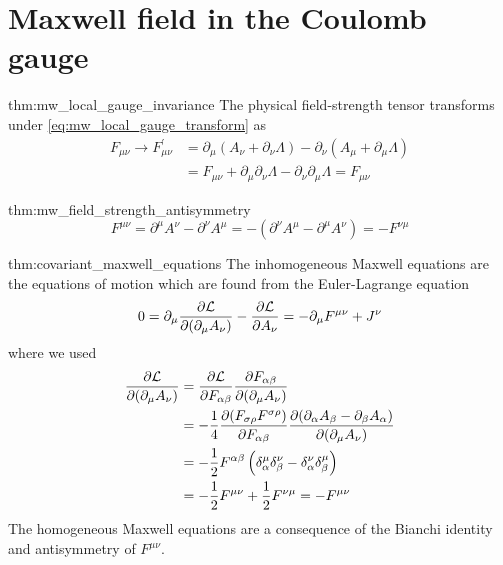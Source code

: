 \section{Maxwell field in the Coulomb gauge}

\begin{delayedproof}{thm:mw_local_gauge_invariance}
	The physical field-strength tensor transforms under \cref{eq:mw_local_gauge_transform} as
	\begin{equation*}
		\begin{split}
			F_{\mu\nu}
			\to
			F_{\mu\nu}^\prime
			&=
			\partial_\mu\left(A_\nu+\partial_\nu\Lambda\right)
			-
			\partial_\nu\left(A_\mu+\partial_\mu\Lambda\right)
			\\
			&=
			F_{\mu\nu}
			+
			\partial_\mu\partial_\nu\Lambda
			-
			\partial_\nu\partial_\mu\Lambda
			=
			F_{\mu\nu}
		\end{split}
	\end{equation*}	
\end{delayedproof}

\begin{delayedproof}{thm:mw_field_strength_antisymmetry}
	\begin{equation*}
		F^{\mu\nu}
		=
		\partial^\mu A^\nu
		-
		\partial^\nu A^\mu
		=
		-
		\left(
			\partial^\nu A^\mu
			-
			\partial^\mu A^\nu
		\right)
		=
		-
		F^{\nu\mu}
	\end{equation*}
\end{delayedproof}

\begin{delayedproof}{thm:covariant_maxwell_equations}
	The inhomogeneous Maxwell equations are the equations of motion which are found from the Euler-Lagrange equation
	\begin{equation*}
		0
		=
		\partial_\mu
		\pdv{\mathcal{L}}{(\partial_\mu A_\nu)}
		-
		\pdv{\mathcal{L}}{A_\nu}
		=
		-
		\partial_\mu
		F^{\mu\nu}
		+
		J^\nu
	\end{equation*}
	where we used
	\begin{equation*}
		\begin{split}
			\pdv{\mathcal{L}}{(\partial_\mu A_\nu)}
			&=
			\pdv{\mathcal{L}}{F_{\alpha\beta}}
			\pdv{F_{\alpha\beta}}{(\partial_\mu A_\nu)}
			\\
			&=
			-
			\frac{1}{4}
			\pdv{(F_{\sigma\rho}F^{\sigma\rho})}{F_{\alpha\beta}}
			\pdv{(\partial_\alpha A_\beta-\partial_\beta A_\alpha)}{(\partial_\mu A_\nu)}
			\\
			&=
			-
			\frac{1}{2}
			F^{\alpha\beta}
			\left(
				\delta_\alpha^\mu
				\delta_\beta^\nu
				-
				\delta_\alpha^\nu
				\delta_\beta^\mu
			\right)
			\\
			&=
			-
			\frac{1}{2}
			F^{\mu\nu}
			+
			\frac{1}{2}
			F^{\nu\mu}
			=
			-
			F^{\mu\nu}			
		\end{split}
	\end{equation*}
	The homogeneous Maxwell equations are a consequence of the Bianchi identity and antisymmetry of $F^{\mu\nu}$.
\end{delayedproof}

